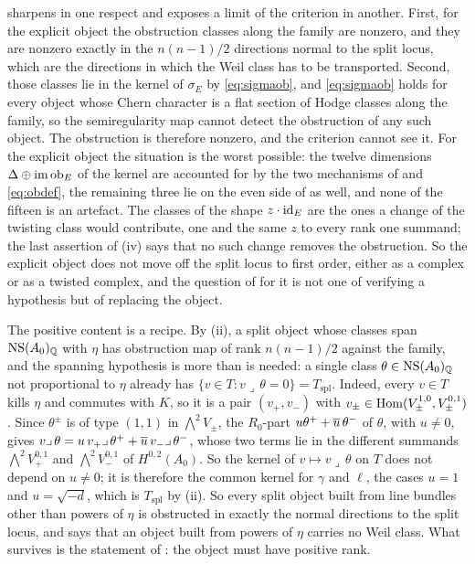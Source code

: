 \begin{remark}\label{rem:obstructionmeaning}
 sharpens  in one
respect and exposes a limit of the criterion in another. First, for the
explicit object the obstruction classes along the family are nonzero, and
they are nonzero exactly in the $n(n-1)/2$ directions normal to the split
locus, which are the directions in which the Weil class has to be
transported. Second, those classes lie in the kernel of $\sigma_{E}$ by
\eqref{eq:sigmaob}, and \eqref{eq:sigmaob} holds for every object whose
Chern character is a flat section of Hodge classes along the family, so the
semiregularity map cannot detect the obstruction of any such object. The
obstruction is therefore nonzero, and the criterion cannot see it. For
the explicit object the
situation is the worst possible: the twelve dimensions
$\Delta\oplus\operatorname{im}\operatorname{ob}_{E}$ of the kernel are accounted for by the two
mechanisms of  and \eqref{eq:obdef}, the remaining
three lie on the even side of  as well, and none of
the fifteen is an artefact. The classes of the shape $z\cdot\operatorname{id}_{E}$ are the
ones a change of the twisting class would contribute, one and the same $z$
to every rank one summand; the last assertion of (iv) says that no such
change removes the obstruction. So the explicit object does not move off the
split locus to first order, either as a complex or as a twisted complex, and
the question of  for it is not one of verifying a
hypothesis but of replacing the object.

The positive content is a recipe. By (ii), a split object whose classes
span $\mathrm{NS}(A_{0})_{\mathbb{Q}}$ with $\eta$ has obstruction map of rank
$n(n-1)/2$ against the family, and the spanning hypothesis is more than is
needed: a single class $\theta\in\mathrm{NS}(A_{0})_{\mathbb{Q}}$ not proportional to
$\eta$ already has $\{v\in T:v\lrcorner\,\theta=0\}=T_{\mathrm{spl}}$.
Indeed, every $v\in T$ kills $\eta$ and commutes with $K$, so it is a pair
$(v_{+},v_{-})$ with $v_{\pm}\in\operatorname{Hom}(V_{\pm}^{1,0},V_{\pm}^{0,1})$. Since
$\theta^{\pm}$ is of type $(1,1)$ in $\bigwedge^{2}V_{\pm}$, the $R_{0}$-part
$u\theta^{+}+\overline{u}\,\theta^{-}$ of $\theta$, with $u\ne0$, gives
$v\lrcorner\,\theta=u\,v_{+}\lrcorner\,\theta^{+}+\overline{u}\,v_{-}\lrcorner\,\theta^{-}$,
whose two terms lie in the different summands $\bigwedge^{2}V_{+}^{0,1}$ and
$\bigwedge^{2}V_{-}^{0,1}$ of $H^{0,2}(A_{0})$. So the kernel of
$v\mapsto v\lrcorner\,\theta$ on $T$ does not depend on $u\ne0$; it is
therefore the common kernel for $\gamma$ and $\ell$, the cases $u=1$ and
$u=\sqrt{-d}$, which is $T_{\mathrm{spl}}$ by (ii). So every split object built from line bundles
other than powers of $\eta$ is obstructed in exactly the normal directions
to the split locus, and  says that an object built
from powers of $\eta$ carries no Weil class. What survives is the statement
of : the object must have positive rank.
\end{remark}

